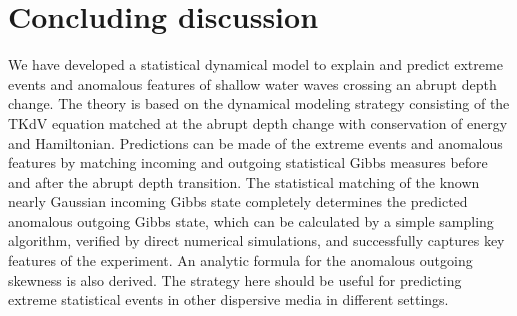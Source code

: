 \documentclass[9pt,twocolumn,twoside,lineno]{pnas-new}
\begin{document}
\begin{itemize}

\end{itemize}

\section{Concluding discussion}

We have developed a statistical dynamical model to explain and predict
extreme events and anomalous features of shallow water waves crossing an
abrupt depth change. The theory is based on the dynamical modeling
strategy consisting of the TKdV equation matched at the abrupt depth
change with conservation of energy and Hamiltonian. Predictions can
be made of the extreme events and anomalous features by matching incoming
and outgoing statistical Gibbs measures before and after the abrupt
depth transition. The statistical matching of the known nearly Gaussian
incoming Gibbs state completely determines the predicted anomalous
outgoing Gibbs state, which can be calculated by a simple sampling
algorithm, verified by direct numerical simulations, and successfully
captures key features of the experiment. An analytic formula for the
anomalous outgoing skewness is also derived. The strategy here should
be useful for predicting extreme statistical events in other dispersive
media in different settings.



\showacknow %

\pnasbreak


\end{document}
